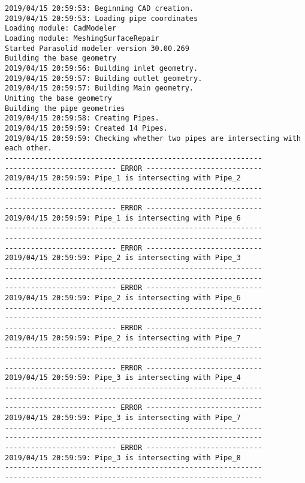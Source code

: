 \documentclass{article}
\begin{document}
{\tiny 
\begin{verbatim}
2019/04/15 20:59:53: Beginning CAD creation.
2019/04/15 20:59:53: Loading pipe coordinates
Loading module: CadModeler
Loading module: MeshingSurfaceRepair
Started Parasolid modeler version 30.00.269
Building the base geometry
2019/04/15 20:59:56: Building inlet geometry.
2019/04/15 20:59:57: Building outlet geometry.
2019/04/15 20:59:57: Building Main geometry.
Uniting the base geometry
Building the pipe geometries
2019/04/15 20:59:58: Creating Pipes.
2019/04/15 20:59:59: Created 14 Pipes.
2019/04/15 20:59:59: Checking whether two pipes are intersecting with each other.
------------------------------------------------------------
-------------------------- ERROR ---------------------------
2019/04/15 20:59:59: Pipe_1 is intersecting with Pipe_2
------------------------------------------------------------
------------------------------------------------------------
-------------------------- ERROR ---------------------------
2019/04/15 20:59:59: Pipe_1 is intersecting with Pipe_6
------------------------------------------------------------
------------------------------------------------------------
-------------------------- ERROR ---------------------------
2019/04/15 20:59:59: Pipe_2 is intersecting with Pipe_3
------------------------------------------------------------
------------------------------------------------------------
-------------------------- ERROR ---------------------------
2019/04/15 20:59:59: Pipe_2 is intersecting with Pipe_6
------------------------------------------------------------
------------------------------------------------------------
-------------------------- ERROR ---------------------------
2019/04/15 20:59:59: Pipe_2 is intersecting with Pipe_7
------------------------------------------------------------
------------------------------------------------------------
-------------------------- ERROR ---------------------------
2019/04/15 20:59:59: Pipe_3 is intersecting with Pipe_4
------------------------------------------------------------
------------------------------------------------------------
-------------------------- ERROR ---------------------------
2019/04/15 20:59:59: Pipe_3 is intersecting with Pipe_7
------------------------------------------------------------
------------------------------------------------------------
-------------------------- ERROR ---------------------------
2019/04/15 20:59:59: Pipe_3 is intersecting with Pipe_8
------------------------------------------------------------
------------------------------------------------------------

\end{verbatim}}
\end{document}
